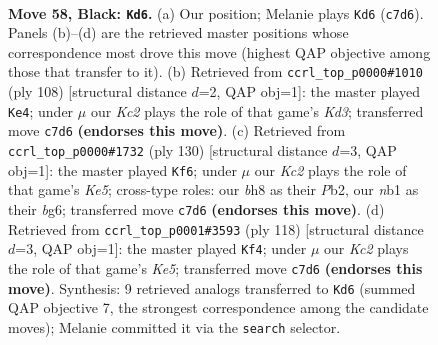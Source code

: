 \documentclass[11pt]{article}
\begin{document}
\clearpage

\begin{figure}[p]\centering
\begin{subfigure}{0.46\textwidth}\centering
\resizebox{\linewidth}{!}{%
\newchessgame
\chessboard[
  setfen={7B/2k5/p7/8/2p3b1/8/5K2/1N6 b - - 15 58},
  showmover=false,
  pgfstyle=straightmove, color=movearrow, markmove={c7-d6}
]}
\caption{}
\end{subfigure}\hfill
\begin{subfigure}{0.46\textwidth}\centering
\resizebox{\linewidth}{!}{%
\newchessgame
\chessboard[
  setfen={8/6k1/8/8/5PPb/3K4/B7/8 w - - 1 55},
  showmover=false,
  pgfstyle=straightmove, color=movearrow, markmove={d3-e4}
]}
\caption{}
\end{subfigure}
\\[4pt]
\begin{subfigure}{0.46\textwidth}\centering
\resizebox{\linewidth}{!}{%
\newchessgame
\chessboard[
  setfen={5B2/3k4/6b1/4K3/8/1p2P3/1P6/8 w - - 7 66},
  showmover=false,
  pgfstyle=straightmove, color=movearrow, markmove={e5-f6}
]}
\caption{}
\end{subfigure}\hfill
\begin{subfigure}{0.46\textwidth}\centering
\resizebox{\linewidth}{!}{%
\newchessgame
\chessboard[
  setfen={8/5k2/2b5/4K3/6BP/4P3/8/8 w - - 3 60},
  showmover=false,
  pgfstyle=straightmove, color=movearrow, markmove={e5-f4}
]}
\caption{}
\end{subfigure}
\caption{\textbf{Move 58, Black: \texttt{Kd6}.} (a) Our position; Melanie plays \texttt{Kd6} (\texttt{c7d6}). Panels (b)--(d) are the retrieved master positions whose correspondence most drove this move (highest QAP objective among those that transfer to it). (b) Retrieved from \texttt{ccrl\_top\_p0000\#1010} (ply 108) [structural distance $d$=2, QAP obj=1]: the master played \texttt{Ke4}; under $\mu$ our \emph{Kc2} plays the role of that game's \emph{Kd3}; transferred move \texttt{c7d6} \textbf{(endorses this move)}. (c) Retrieved from \texttt{ccrl\_top\_p0000\#1732} (ply 130) [structural distance $d$=3, QAP obj=1]: the master played \texttt{Kf6}; under $\mu$ our \emph{Kc2} plays the role of that game's \emph{Ke5}; cross-type roles: our \emph{b}h8 as their \emph{P}b2, our \emph{n}b1 as their \emph{b}g6; transferred move \texttt{c7d6} \textbf{(endorses this move)}. (d) Retrieved from \texttt{ccrl\_top\_p0001\#3593} (ply 118) [structural distance $d$=3, QAP obj=1]: the master played \texttt{Kf4}; under $\mu$ our \emph{Kc2} plays the role of that game's \emph{Ke5}; transferred move \texttt{c7d6} \textbf{(endorses this move)}. Synthesis: 9 retrieved analogs transferred to \texttt{Kd6} (summed QAP objective 7, the strongest correspondence among the candidate moves); Melanie committed it via the \texttt{search} selector.}
\label{fig:thought-m115}
\end{figure}
\end{document}
